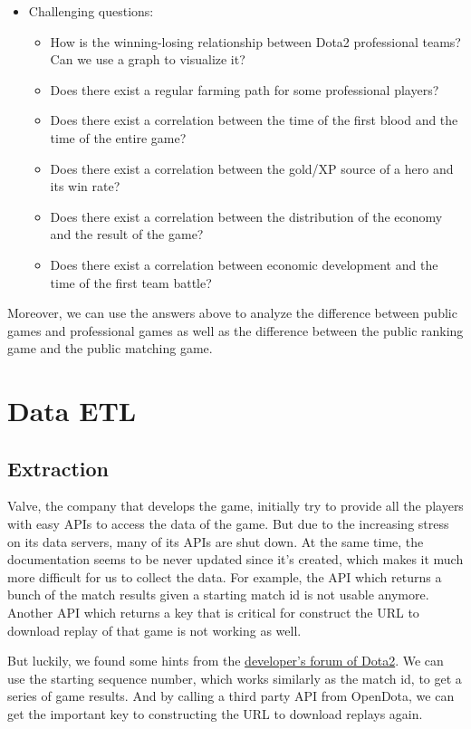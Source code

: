 \documentclass{article}
\begin{document}
\begin{itemize}
\begin{itemize}
    \end{itemize}
    \item Challenging questions:
    \begin{itemize}
        \item How is the winning-losing relationship between Dota2 professional teams? Can we use a graph to visualize it?
        \item Does there exist a regular farming path for some professional players?
        \item Does there exist a correlation between the time of the first blood and the time of the entire game?
        \item Does there exist a correlation between the gold/XP source of a hero and its win rate?
        \item Does there exist a correlation between the distribution of the economy and the result of the game?
        \item Does there exist a correlation between economic development and the time of the first team battle?
    \end{itemize}
\end{itemize}

Moreover, we can use the answers above to analyze the difference between public games and professional games as well as the difference between the public ranking game and the public matching game.


\section{Data ETL}

\subsection{Extraction}

Valve, the company that develops the game, initially try to provide all the players with easy APIs to access the data of the game.
But due to the increasing stress on its data servers, many of its APIs are shut down.
At the same time, the documentation seems to be never updated since it's created, which makes it much more difficult for us to collect the data.
For example, the API which returns a bunch of the match results given a starting match id is not usable anymore.
Another API which returns a key that is critical for construct the URL to download replay of that game is not working as well.

But luckily, we found some hints from the \href{https://dev.dota2.com}{developer's forum of Dota2}.
We can use the starting sequence number, which works similarly as the match id, to get a series of game results.
And by calling a third party API from OpenDota, we can get the important key to constructing the URL to download replays again.
\end{document}
